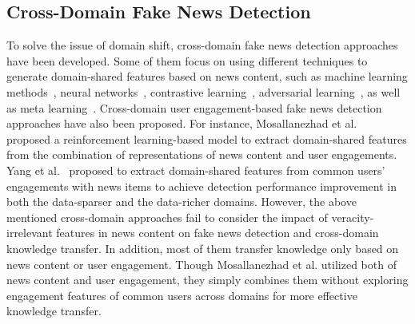 \subsection{Cross-Domain Fake News Detection}
To solve the issue of domain shift, cross-domain fake news detection approaches have been developed. Some of them focus on using different techniques to generate domain-shared features based on news content, such as machine learning methods~\cite{castelo2019topic}, neural networks~\cite{zhu2022memory}, contrastive learning~\cite{ran2023unsupervised, yue2022contrastive}, adversarial learning~\cite{wang2018eann, silva2021embracing}, as well as meta learning~\cite{yue2023metaadapt}. Cross-domain user engagement-based fake news detection approaches have also been proposed. For instance, Mosallanezhad et al.~\cite{mosallanezhad2022domain} proposed a reinforcement learning-based model to extract domain-shared features from the combination of representations of news content and user engagements. Yang et al.~\cite{yang2024update} proposed to extract domain-shared features from common users' engagements with news items to achieve detection performance improvement in both the data-sparser and the data-richer domains. However, the above mentioned cross-domain approaches fail to consider the impact of veracity-irrelevant features in news content on fake news detection and cross-domain knowledge transfer. In addition, most of them transfer knowledge only based on news content or user engagement. Though Mosallanezhad et al. utilized both of  news content and user engagement, they simply combines them without exploring engagement features of common users across domains for more effective knowledge transfer.